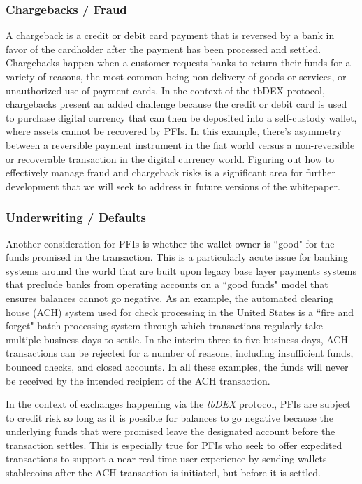 \documentclass[11pt]{article}
\begin{document}
\subsubsection{Chargebacks / Fraud}

A chargeback is a credit or debit card payment that is reversed by a bank in favor of the cardholder after the payment has been processed and settled. Chargebacks happen when a customer requests banks to return their funds for a variety of reasons, the most common being non-delivery of goods or services, or unauthorized use of payment cards. In the context of the tbDEX protocol, chargebacks present an added challenge because the credit or debit card is used to purchase digital currency that can then be deposited into a self-custody wallet, where assets cannot be recovered by PFIs. In this example, there’s asymmetry between a reversible payment instrument in the fiat world versus a non-reversible or recoverable transaction in the digital currency world. Figuring out how to effectively manage fraud and chargeback risks is a significant area for further development that we will seek to address in future versions of the whitepaper.

\subsubsection{Underwriting / Defaults}

Another consideration for PFIs is whether the wallet owner is ``good" for the funds promised in the transaction. This is a particularly acute issue for banking systems around the world that are built upon legacy base layer payments systems that preclude banks from operating accounts on a ``good funds" model that ensures balances cannot go negative. As an example, the automated clearing house (ACH) system used for check processing in the United States is a ``fire and forget" batch processing system through which transactions regularly take multiple business days to settle. In the interim three to five business days, ACH transactions can be rejected for a number of reasons, including insufficient funds, bounced checks, and closed accounts. In all these examples, the funds will never be received by the intended recipient of the ACH transaction.  

\vspace{1\baselineskip}
In the context of exchanges happening via the \textit{tbDEX} protocol, PFIs are subject to credit risk so long as it is possible for balances to go negative because the underlying funds that were promised leave the designated account before the transaction settles. This is especially true for PFIs who seek to offer expedited transactions to support a near real-time user experience by sending wallets stablecoins after the ACH transaction is initiated, but before it is settled. 
\end{document}
